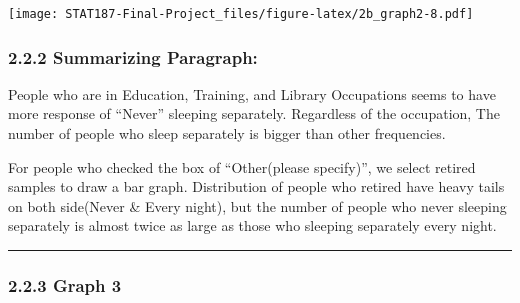 \documentclass[
]{article}
\begin{document}
\texttt{[image: STAT187-Final-Project\_files/figure-latex/2b\_graph2-8.pdf]}

\hypertarget{summarizing-paragraph-1}{%
\subsubsection{2.2.2 Summarizing
Paragraph:}\label{summarizing-paragraph-1}}

People who are in Education, Training, and Library Occupations seems to
have more response of ``Never'' sleeping separately. Regardless of the
occupation, The number of people who sleep separately is bigger than
other frequencies.

For people who checked the box of ``Other(please specify)'', we select
retired samples to draw a bar graph. Distribution of people who retired
have heavy tails on both side(Never \& Every night), but the number of
people who never sleeping separately is almost twice as large as those
who sleeping separately every night.

\begin{center}\rule{0.5\linewidth}{0.5pt}\end{center}

\hypertarget{graph-3}{%
\subsubsection{2.2.3 Graph 3}\label{graph-3}}
\end{document}
